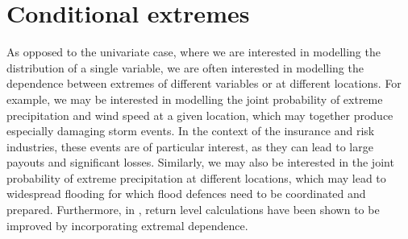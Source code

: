 \documentclass{article}
\numberwithin{equation}{section}
\begin{document}

\newpage
\section{Conditional extremes}\label{sec:ce}



As opposed to the univariate case, where we are interested in modelling the distribution of a single variable, we are often interested in modelling the dependence between extremes of different variables or at different locations.
For example, we may be interested in modelling the joint probability of extreme precipitation and wind speed at a given location, which may together produce especially damaging storm events.
In the context of the insurance and risk industries, these events are of particular interest, as they can lead to large payouts and significant losses.
Similarly, we may also be interested in the joint probability of extreme precipitation at different locations, which may lead to widespread flooding for which flood defences need to be coordinated and prepared.
Furthermore, in \cite{Zhang2024}, return level calculations have been shown to be improved by incorporating extremal dependence.
\end{document}
